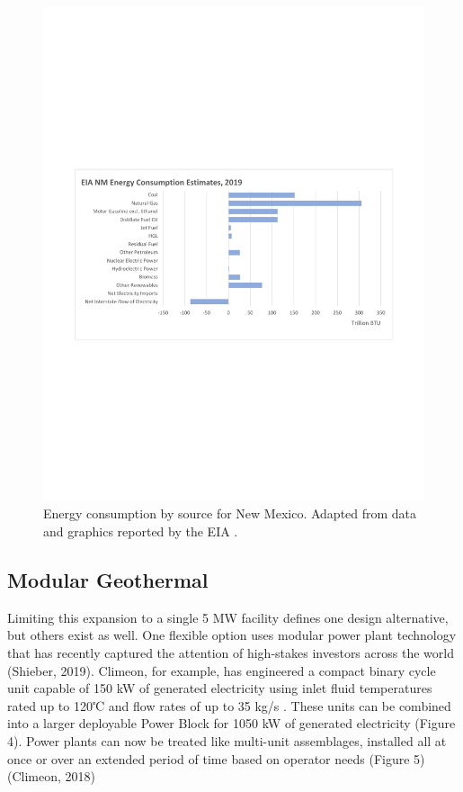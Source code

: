 \begin{figure}[!htp]
\centering
\includegraphics[width=\textwidth]{templates/images/Figure-EIA_NM_Energy_Consumption.pdf}
\caption[NM energy consumption]{Energy consumption by source for New Mexico. Adapted from data and graphics reported by the EIA \protect\citep{eia_new_2021}.}
\label{fig:nm_energy_consumption}
\end{figure}

\subsection{Modular Geothermal}

Limiting this expansion to a single 5 MW facility defines one design alternative, but others exist as well. One flexible option uses modular power plant technology that has recently captured the attention of high-stakes investors across the world (Shieber, 2019). Climeon, for example, has engineered a compact binary cycle unit capable of 150 kW of generated electricity using inlet fluid temperatures rated up to 120℃ and flow rates of up to 35 kg/s \citep{climeon_climeon_2021}. These units can be combined into a larger deployable Power Block for 1050 kW of generated electricity \citep{winther_power_2018} (Figure 4). Power plants can now be treated like multi-unit assemblages, installed all at once or over an extended period of time based on operator needs (Figure 5) (Climeon, 2018)





